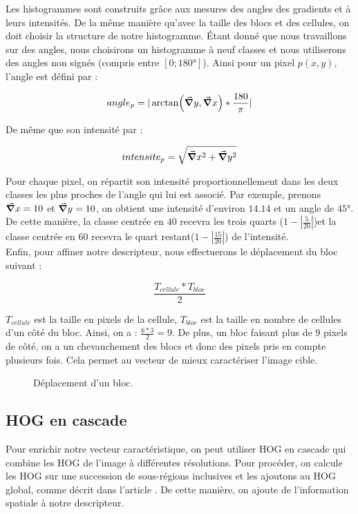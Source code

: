 Les histogrammes sont construits grâce aux mesures des angles des gradients et à leurs intensités. De la même manière qu'avec la taille des blocs et des cellules, on doit choisir la structure de notre histogramme. Étant donné que nous travaillons sur des angles, nous choisirons un histogramme à neuf classes et nous utiliserons des angles non signés (compris entre $[0; 180°]$).
Ainsi pour un pixel $p(x,y)$, l'angle est défini par :

\[ angle_{p} = |\arctan (\grad y, \grad x)*\frac{180}{\pi}| \]

De même que son intensité par :

\[ intensite_{p} = \sqrt{\grad x^{2} + \grad y^{2}} \]

Pour chaque pixel, on répartit son intensité proportionnellement dans les deux classes les plus proches de l'angle qui lui est associé. 
Par exemple, prenons $\grad x = 10$ et $\grad y = 10$, on obtient une intensité d'environ $14.14$ et un angle de $45°$. De cette manière, la classe centrée en $40$ recevra les trois quarts ($1 - |\frac{5}{20}|$)et la classe centrée en $60$ recevra le quart restant($1 - |\frac{15}{20}|$) de l'intensité.\\


Enfin, pour affiner notre descripteur, nous effectuerons le déplacement du bloc suivant :

\[ \frac{T_{cellule} * T_{bloc}}{2} \]

$T_{cellule}$ est la taille en pixels de la cellule,
$T_{bloc}$ est la taille en nombre de cellules d'un côté du bloc.
Ainsi, on a : $\frac{6*3}{2} = 9$. De plus, un bloc faisant plus de 9 pixels de côté, on a un chevauchement des blocs et donc des pixels pris en compte plusieurs fois. Cela permet au vecteur de mieux caractériser l'image cible.

\begin{figure}[!htbp]
\center
\caption{Déplacement d'un bloc.}
\label{fig:blocOverlap}
\end{figure}
\FloatBarrier

\subsection{HOG en cascade}

Pour enrichir notre vecteur caractéristique, on peut utiliser HOG en cascade qui combine les HOG de l'image à différentes résolutions. Pour procéder, on calcule les HOG sur une succession de sous-régions inclusives et les ajoutons au HOG global, comme décrit dans l'article \cite{qiang_zhu_fast_2006}. De cette manière, on ajoute de l'information spatiale à notre descripteur.

